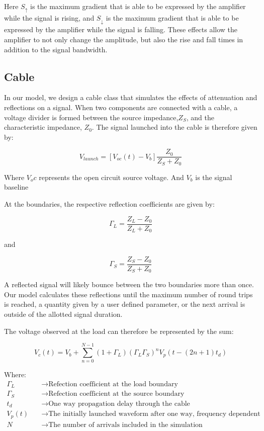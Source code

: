 \documentclass[10pt]{article}
\begin{document}
Here $S_{\uparrow}$ is the maximum gradient that is able to be expressed by the amplifier while the signal is rising, and $S_{\downarrow}$ is the maximum gradient that is able to be expressed by the amplifier while the signal is falling. These effects allow the amplifier to not only change the amplitude, but also the rise and fall times in addition to the signal bandwidth. 



\subsection{Cable}


In our model, we design a cable class that simulates the effects of attenuation and reflections on a signal. When two components are connected with a cable, a voltage divider is formed between the source impedance,$Z_S$, and the characteristic impedance, $Z_0$. The signal launched into the cable is therefore given by: 

$$
V_{launch} = [V_{oc}(t) - V_b]\frac{Z_0}{Z_S+Z_0}
$$


Where $V_oc$ represents the open circuit source voltage. And $V_b$ is the signal baseline

At the boundaries, the respective reflection coefficients are given by:

$$
\Gamma_L = \frac{Z_L - Z_0}{Z_L + Z_0}
$$

and 

$$
\Gamma_S = \frac{Z_S - Z_0}{Z_S + Z_0}
$$


A reflected signal will likely bounce between the two boundaries more than once. Our model calculates these reflections until the maximum number of round trips is reached, a quantity given by a user defined parameter, or the next arrival is outside of the allotted signal duration. 


The voltage observed at the load can therefore be represented by the sum: 

$$
   V_{c}(t) = V_b + \sum_{n = 0}^{N-1} (1 + \Gamma_L)(\Gamma_L\Gamma_S)^n  V_{p}(t - (2n+1)t_{d})
$$

Where:
\begin{align*}
\Gamma_L &\quad\to \text{Refection coefficient at the load boundary} \\
\Gamma_S  &\quad\to \text{Refection coefficient at the source boundary} \\
t_d  &\quad\to \text{One way propagation delay through the cable} \\
V_p(t)    &\quad\to \text{The initially launched waveform after one way, frequency dependent attenuation} \\
N    &\quad\to \text{The number of arrivals included in the simulation} \\
\end{align*}
\end{document}
